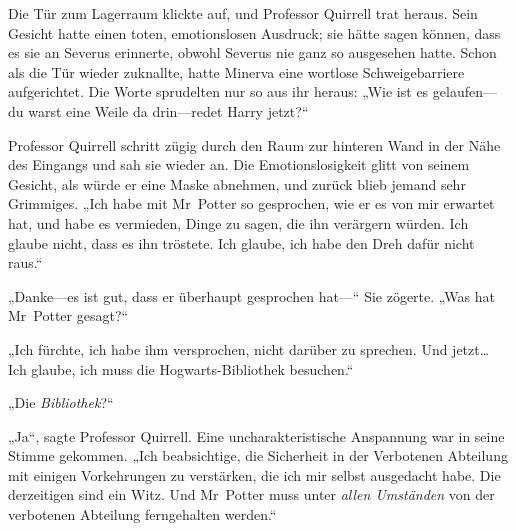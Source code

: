 \later


Die Tür zum Lagerraum klickte auf, und Professor Quirrell trat heraus. Sein Gesicht hatte einen toten, emotionslosen Ausdruck; sie hätte sagen können, dass es sie an Severus erinnerte, obwohl Severus nie ganz so ausgesehen hatte. Schon als die Tür wieder zuknallte, hatte Minerva eine wortlose Schweigebarriere aufgerichtet. Die Worte sprudelten nur so aus ihr heraus: „Wie ist es gelaufen—du warst eine Weile da drin—redet Harry jetzt?“

Professor Quirrell schritt zügig durch den Raum zur hinteren Wand in der Nähe des Eingangs und sah sie wieder an. Die Emotionslosigkeit glitt von seinem Gesicht, als würde er eine Maske abnehmen, und zurück blieb jemand sehr Grimmiges.
„Ich habe mit Mr~Potter so gesprochen, wie er es von mir erwartet hat, und habe es vermieden, Dinge zu sagen, die ihn verärgern würden. Ich glaube nicht, dass es ihn tröstete. Ich glaube, ich habe den Dreh dafür nicht raus.“

„Danke—es ist gut, dass er überhaupt gesprochen hat—“
Sie zögerte.
„Was hat Mr~Potter gesagt?“

„Ich fürchte, ich habe ihm versprochen, nicht darüber zu sprechen. Und jetzt… Ich glaube, ich muss die Hogwarts-Bibliothek besuchen.“

„Die \emph{Bibliothek}?“

„Ja“, sagte Professor Quirrell.
Eine uncharakteristische Anspannung war in seine Stimme gekommen.
„Ich beabsichtige, die Sicherheit in der Verbotenen Abteilung mit einigen Vorkehrungen zu verstärken, die ich mir selbst ausgedacht habe. Die derzeitigen sind ein Witz. Und Mr~Potter muss unter \emph{allen Umständen} von der verbotenen Abteilung ferngehalten werden.“

